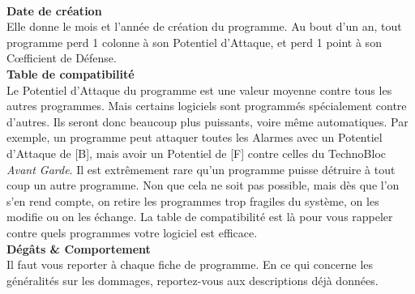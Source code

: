 \documentclass[11pt,twoside,a4paper]{article}
\begin{document}
\begin{multicols*}{2}
\vfill ~\\
\columnbreak

\textbf{Date de cr{\'e}ation}~\\
Elle donne le mois et l'ann{\'e}e de cr{\'e}ation du programme. Au bout d'un an, tout programme perd 1 colonne {\`a} son Potentiel d'Attaque, et perd 1 point {\`a} son C\oe fficient de D{\'e}fense. ~\\

\textbf{Table de compatibilit{\'e}}~\\
Le Potentiel d'Attaque du programme est une valeur moyenne contre tous les autres programmes. Mais certains logiciels sont programm{\'e}s sp{\'e}cialement contre d'autres. Ils seront donc beaucoup plus puissants, voire m{\^e}me automatiques. Par exemple, un programme peut attaquer toutes les Alarmes avec un Potentiel d'Attaque de [B], mais avoir un Potentiel de [F] contre celles du TechnoBloc \emph{Avant Garde}. Il est extr{\^e}mement rare qu'un programme puisse d{\'e}truire {\`a} tout coup un autre programme. Non que cela ne soit pas possible, mais d{\`e}s que l'on s'en rend compte, on retire les programmes trop fragiles du syst{\`e}me, on les modifie ou on les {\'e}change. La table de compatibilit{\'e} est l{\`a} pour vous rappeler contre quels programmes votre logiciel est efficace. ~\\

\textbf{D{\'e}g{\^a}ts \& Comportement}~\\
Il faut vous reporter {\`a} chaque fiche de programme. En ce qui concerne les g{\'e}n{\'e}ralit{\'e}s sur les dommages, reportez-vous aux descriptions d{\'e}j{\`a} donn{\'e}es. ~\\


\end{multicols*}
\end{document}
